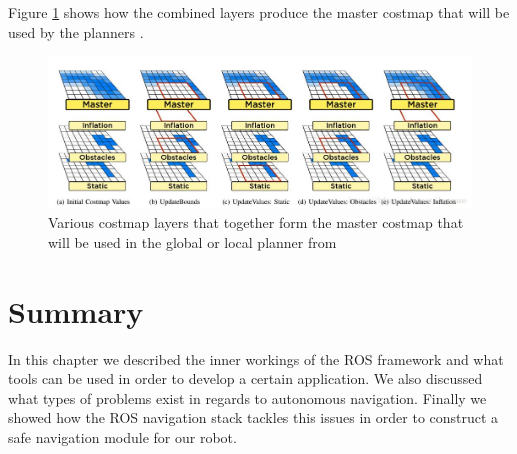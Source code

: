 Figure \ref{fig:layers1} shows how the combined layers produce the master costmap that will be used by the planners \cite{lu2014layered}.

\begin{figure}[!htb]
    \centering
    \includegraphics[width=\linewidth]{imgs/chapter3/layers1.png}
    \caption[Various costmap layers that together form the master costmap]{Various costmap layers that together form the master costmap that will be used in the global or local planner from \cite{lu2014layered}}
    \label{fig:layers1}
\end{figure}
\section{Summary}
In this chapter we described the inner workings of the ROS framework and what tools can be used in order to develop a certain application. We also discussed what types of problems exist in regards to autonomous navigation. Finally we showed how the ROS navigation stack tackles this issues in order to construct a safe navigation module for our robot.


